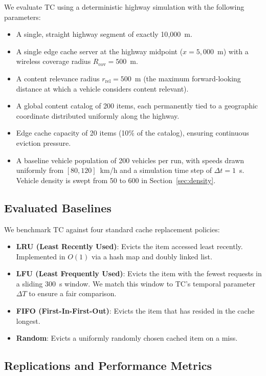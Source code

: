 \documentclass[preprint,12pt]{elsarticle}
\begin{document}
	We evaluate TC using a deterministic highway simulation with the following parameters:
	\begin{itemize}
		\item A single, straight highway segment of exactly 10{,}000~m.
		\item A single edge cache server at the highway midpoint ($x = 5{,}000$~m) with a wireless coverage radius $R_\text{cov} = 500$~m.
		\item A content relevance radius $r_\text{rel} = 500$~m (the maximum forward-looking distance at which a vehicle considers content relevant).
		\item A global content catalog of 200 items, each permanently tied to a geographic coordinate distributed uniformly along the highway.
		\item Edge cache capacity of 20 items (10\% of the catalog), ensuring continuous eviction pressure.
		\item A baseline vehicle population of 200 vehicles per run, with speeds drawn uniformly from $[80, 120]$~km/h and a simulation time step of $\Delta t = 1$~s. Vehicle density is swept from 50 to 600 in Section~\ref{sec:density}.
	\end{itemize}
	
	\subsection{Evaluated Baselines}
	
	We benchmark TC against four standard cache replacement policies:
	\begin{itemize}
		\item \textbf{LRU (Least Recently Used)}: Evicts the item accessed least recently. Implemented in $O(1)$ via a hash map and doubly linked list.
		\item \textbf{LFU (Least Frequently Used)}: Evicts the item with the fewest requests in a sliding 300~s window. We match this window to TC's temporal parameter $\Delta T$ to ensure a fair comparison.
		\item \textbf{FIFO (First-In-First-Out)}: Evicts the item that has resided in the cache longest.
		\item \textbf{Random}: Evicts a uniformly randomly chosen cached item on a miss.
	\end{itemize}
	
	\subsection{Replications and Performance Metrics}
	
\end{document}
